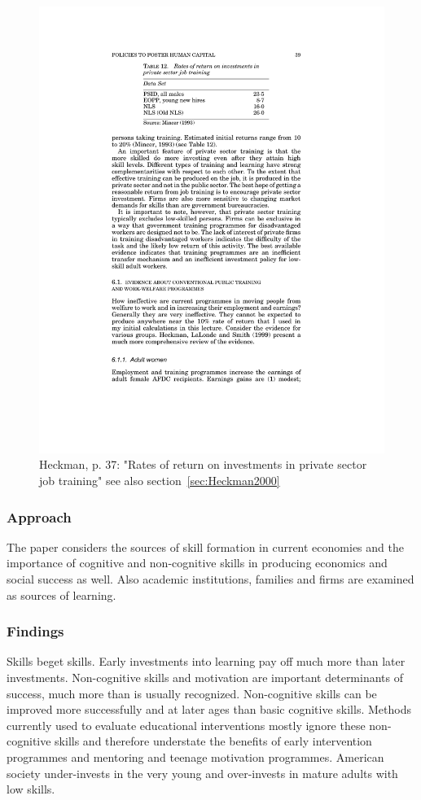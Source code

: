 \documentclass[12pt,a4paper]{article}
\begin{document}
    \begin{figure}[htb]
      \centering
      \includegraphics[width=12cm]{Meeting 10 Policies to foster human capital - Seite 37.pdf}
      \caption{Heckman, p. 37: "Rates of return on investments in private sector job training" see also section~\ref{sec:Heckman2000}}
      \label{fig:Heckman privatesectorjobtraining}
    \end{figure}


      \subsubsection{Approach}
        The paper considers the sources of skill formation in current economies and the importance of cognitive and non-cognitive skills in producing economics and social success as well. Also academic institutions, families and firms are examined as sources of learning.
      \subsubsection{Findings}
        Skills beget skills. Early investments into learning pay off much more than later investments. Non-cognitive skills and motivation are important determinants of success, much more than is usually recognized. Non-cognitive skills can be improved more successfully and at later ages than basic cognitive skills. Methods currently used to evaluate educational interventions mostly ignore these non-cognitive skills and therefore understate the benefits of early intervention programmes and mentoring and teenage motivation programmes. American society under-invests in the very young and over-invests in mature adults with low skills.
\end{document}
